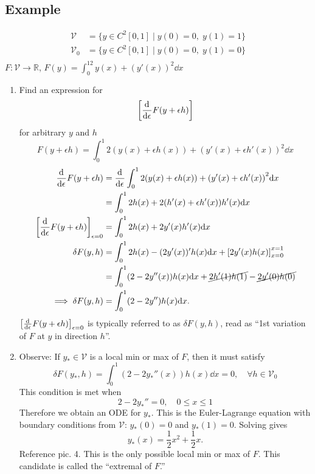 \documentclass[12pt,twoside]{article}
\begin{document}
\subsection{Example}
\begin{equation*}
  \begin{aligned}
    \mathcal{V}&=\{y\in C^2[0,1]\;|\;y(0)=0,\; y(1)=1\} \\
    \mathcal{V}_0&= \{y\in C^2[0,1]\;|\;y(0)=0,\; y(1)=0\} \\
  \end{aligned}
\end{equation*}
$F:\mathcal{V}\rightarrow\mathbb{R}$, $F(y)=\int_0^12y(x)+{(y'(x))}^2\dd{x}$
\begin{enumerate}
\item Find an expression for
$$\left[\frac{\mathrm{d}^{} {}}{\mathrm{d}{\epsilon}^{}}F(y+\epsilon h)\right]$$ for arbitrary $y$ and $h$
$$F(y+\epsilon h)=\int_0^1 2(y(x)+\epsilon h(x))+{(y'(x)+\epsilon h'(x))}^2\dd{x}$$
\begin{equation*}
  \begin{aligned}
    \frac{\mathrm{d}^{} {}}{\mathrm{d}{\epsilon}^{}}F(y+\epsilon h) &=
    \frac{\mathrm{d}^{} {}}{\mathrm{d}{\epsilon}^{}}\int_0^1 2(y(x)+\epsilon h(x))+{(y'(x)+\epsilon h'(x))}^2\mathrm{d}{x} \\
    &= \int_0^1 2 h(x) + 2(h'(x)+\epsilon h'(x))h'(x)\mathrm{d}{x} \\
    {\left[\frac{\mathrm{d}^{} {}}{\mathrm{d}{\epsilon}^{}}F(y+\epsilon h)\right]}_{\epsilon=0} &= \int_0^1 2h(x)+2y'(x)h'(x)\mathrm{d}{x} \\
    \delta F(y,h) &= \int_0^1 2h(x) - (2y'(x))' h(x) \mathrm{d}{x} + {\left[ 2y'(x)h(x) \right]}_{x=0}^{x=1} \\
    &= \int_0^1(2-2y''(x))h(x)\mathrm{d}{x} + \cancel{2h'(1)h(1)} - \cancel{2y'(0)h(0)} \\
    \implies \delta F(y,h) &= \int_0^1(2-2y'')h(x)\mathrm{d}{x}.
  \end{aligned}
\end{equation*}
$\left[\frac{\mathrm{d}^{} {}}{\mathrm{d}{\epsilon}^{}}F(y+\epsilon h)\right]_{\epsilon=0}$ is typically referred
to as $\delta F(y,h)$, read as ``1st variation of $F$ at $y$ in direction
$h$''.
\item Observe: If $y_*\in\mathcal{V}$ is a local min or max of $F$, then it must
  satisfy
$$\delta F(y_*,h)=\int_0^1(2-2y_*''(x))h(x)\dd{x}=0,\quad \forall
h\in\mathcal{V_0}$$
This condition is met when
$$2-2y_*''=0,\quad 0\le x\le 1$$
Therefore we obtain an ODE for $y_*$. This is the Euler-Lagrange equation with
boundary conditions from $\mathcal{V}$: $y_*(0)=0$ and $y_*(1)=0$. Solving gives
$$y_*(x)=\frac{1}{2}x^2 + \frac{1}{2}x.$$
Reference pic. 4. This is the only possible local min or max of $F$. This
candidate is called the ``extremal of $F$.''
\end{enumerate}
\end{document}
